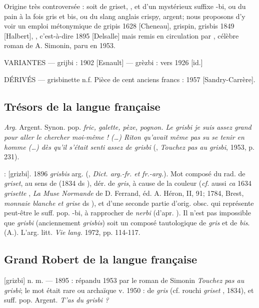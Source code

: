Origine très controversée : soit de griset, , et d'un
mystérieux suffixe -bi, ou du pain à la fois gris et bis, ou du slang anglais
crispy, argent; nous proposons d'y voir un emploi métonymique de gripis 1628
[Cheneau], grispin, grisbis 1849 [Halbert], , c'est-à-dire  1895 [Delsalle] mais remis en circulation par , célèbre roman de A. Simonin, paru en 1953.

VARIANTES ---  grijbi : 1902 [Esnault] --- grèzbi : vers 1926 [id.]

DÉRIVÉS --- grisbinette n.f. Pièce de cent anciens francs : 1957
[Sandry-Carrère].


\subsection*{Trésors de la langue française}

\emph{Arg.} Argent. Synon. pop. \emph{fric, galette, pèze, pognon. Le grisbi je suis assez grand pour aller le chercher moi-même ! (\ldots) Riton qu'avait même pas su se tenir en homme (\ldots) dès qu'il s'était senti assez de grisbi} (, \emph{Touchez pas au grisbi}, 1953, p. 231).

 : [grizbi].   1896 \emph{grisbis}
arg.  (, \emph{Dict. arg.-fr. et fr.-arg.}). Mot composé du rad. de \emph{griset}, au sens de  (1834 ds ), dér. de \emph{gris}, à cause de la couleur (\emph{cf.} aussi \emph{ca} 1634 \emph{grisette} , \emph{La Muse Normande} de D. Ferrand, éd. A. Héron, II, 91; 1784, Brest, \emph{monnaie blanche et grise} ds ), et d'une seconde partie d'orig. obsc. qui représente peut-être le suff. pop. -bi, à rapprocher de \emph{nerbi}  (d'apr. ). Il n'est pas impossible que \emph{grisbi} (anciennement \emph{grisbis}) soit un composé tautologique de \emph{gris} et de \emph{bis}.
  (A.). L'arg. litt. \emph{Vie lang.} 1972, pp. 114-117.


\subsection*{Grand Robert de la langue française}

[grizbi] n. m. --- 1895 : répandu 1953 par le roman de Simonin \emph{Touchez pas au grisbi}; le mot était rare ou archaïque v. 1950 : de \emph{gris}  (cf. rouchi \emph{griset} , 1834), et suff. pop.  Argent. \emph{T'as du grisbi ?}

